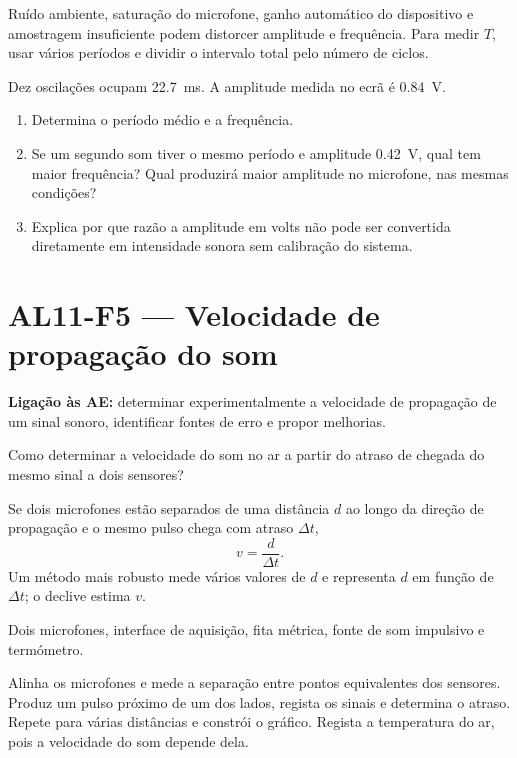 \documentclass[11pt,a4paper,openany]{book}
\newcounter{exercicio}[chapter]
\renewcommand{\theexercicio}{\thechapter.\arabic{exercicio}}
\newenvironment{exercicio}[1][]%
{\refstepcounter{exercicio}%
\begin{tcolorbox}[breakable,colback=white,colframe=eublue!70,
 title={Exercício \theexercicio\if\relax\detokenize{#1}\relax\else\ --- #1\fi},fonttitle=\bfseries]}%
{\end{tcolorbox}}
\newcommand{\LigAE}[1]{\textbf{Ligação às AE:} #1}
\begin{document}
\begin{erros}
Ruído ambiente, saturação do microfone, ganho automático do dispositivo e amostragem insuficiente podem distorcer amplitude e frequência. Para medir $T$, usar vários períodos e dividir o intervalo total pelo número de ciclos.
\end{erros}

\begin{exercicio}[Ler um oscilograma]
Dez oscilações ocupam \SI{22.7}{ms}. A amplitude medida no ecrã é \SI{0.84}{V}.
\begin{enumerate}[label=\alph*)]
\item Determina o período médio e a frequência.
\item Se um segundo som tiver o mesmo período e amplitude \SI{0.42}{V}, qual tem maior frequência? Qual produzirá maior amplitude no microfone, nas mesmas condições?
\item Explica por que razão a amplitude em volts não pode ser convertida diretamente em intensidade sonora sem calibração do sistema.
\end{enumerate}
\end{exercicio}

\section{AL11-F5 — Velocidade de propagação do som}
\LigAE{determinar experimentalmente a velocidade de propagação de um sinal sonoro, identificar fontes de erro e propor melhorias.}

\begin{questao}
Como determinar a velocidade do som no ar a partir do atraso de chegada do mesmo sinal a dois sensores?
\end{questao}

\begin{fundamento}
Se dois microfones estão separados de uma distância $d$ ao longo da direção de propagação e o mesmo pulso chega com atraso $\Delta t$,
\[
v=\frac{d}{\Delta t}.
\]
Um método mais robusto mede vários valores de $d$ e representa $d$ em função de $\Delta t$; o declive estima $v$.
\end{fundamento}

\begin{material}
Dois microfones, interface de aquisição, fita métrica, fonte de som impulsivo e termómetro.
\end{material}

\begin{metodo}
Alinha os microfones e mede a separação entre pontos equivalentes dos sensores. Produz um pulso próximo de um dos lados, regista os sinais e determina o atraso. Repete para várias distâncias e constrói o gráfico. Regista a temperatura do ar, pois a velocidade do som depende dela.
\end{metodo}
\end{document}
